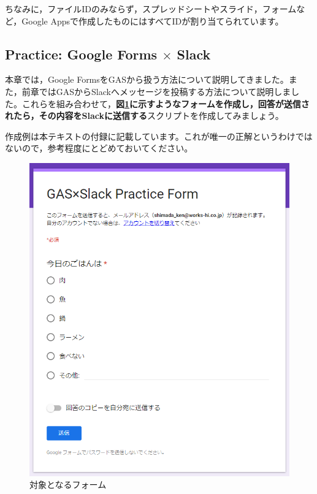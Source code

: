 \documentclass[uplatex,a4j]{jsarticle}
\begin{document}
ちなみに，ファイルIDのみならず，スプレッドシートやスライド，フォームなど，Google Appsで作成したものにはすべてIDが割り当てられています。

\clearpage

\subsection{Practice: Google Forms $\times$ Slack}

本章では，Google FormsをGASから扱う方法について説明してきました。また，前章ではGASからSlackへメッセージを投稿する方法について説明しました。これらを組み合わせて，\textbf{図\ref{fig:practice_form}に示すようなフォームを作成し，回答が送信されたら，その内容をSlackに送信する}スクリプトを作成してみましょう。

作成例は本テキストの付録に記載しています。これが唯一の正解というわけではないので，参考程度にとどめておいてください。

\begin{figure}[H]
 \centering
 \includegraphics[keepaspectratio, scale=0.5]{images/practice_form.png}
 \caption{対象となるフォーム}
 \label{fig:practice_form}
\end{figure}
\end{document}

